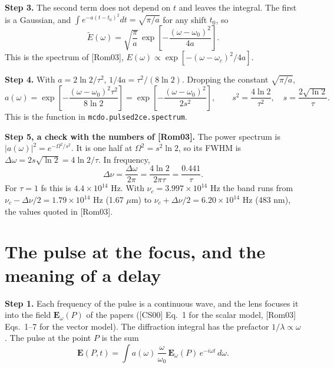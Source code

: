 \documentclass[11pt]{article}
\begin{document}
\textbf{Step 3.} The second term does not depend on $t$ and leaves the integral. The first is a Gaussian, and
$\int e^{-a(t-t_0)^2}dt = \sqrt{\pi/a}$ for any shift $t_0$, so
\begin{equation}\tilde E(\omega) = \sqrt{\frac{\pi}{a}}\,\exp\!\left[-\frac{(\omega-\omega_0)^2}{4a}\right] .\end{equation}
This is the spectrum of [Rom03], $E(\omega) \propto \exp[-(\omega-\omega_c)^2/4a]$.

\textbf{Step 4.} With $a = 2\ln 2/\tau^2$, $1/4a = \tau^2/(8\ln 2)$. Dropping the constant $\sqrt{\pi/a}$,
\begin{equation}a(\omega) = \exp\!\left[-\frac{(\omega-\omega_0)^2\tau^2}{8\ln 2}\right]
= \exp\!\left[-\frac{(\omega-\omega_0)^2}{2s^2}\right],\qquad s^2 = \frac{4\ln 2}{\tau^2},\quad
s = \frac{2\sqrt{\ln 2}}{\tau} .\label{eq:spec}\end{equation}
This is the function in \texttt{mcdo.pulsed2ce.spectrum}.

\textbf{Step 5, a check with the numbers of [Rom03].} The power spectrum is $|a(\omega)|^2 = e^{-\Omega^2/s^2}$. It is
one half at $\Omega^2 = s^2\ln 2$, so its FWHM is $\Delta\omega = 2s\sqrt{\ln 2} = 4\ln 2/\tau$. In frequency,
\begin{equation}\Delta\nu = \frac{\Delta\omega}{2\pi} = \frac{4\ln 2}{2\pi\tau} = \frac{0.441}{\tau} .\end{equation}
For $\tau = 1$ fs this is $4.4\times10^{14}$ Hz. With $\nu_c = 3.997\times10^{14}$ Hz the band runs from
$\nu_c - \Delta\nu/2 = 1.79\times10^{14}$ Hz (1.67 $\mu$m) to $\nu_c + \Delta\nu/2 = 6.20\times10^{14}$ Hz (483 nm),
the values quoted in [Rom03].

\section{The pulse at the focus, and the meaning of a delay}
\textbf{Step 1.} Each frequency of the pulse is a continuous wave, and the lens focuses it into the field
$\mathbf{E}_\omega(P)$ of the papers ([CS00] Eq.~1 for the scalar model, [Rom03] Eqs.~1--7 for the vector model).
The diffraction integral has the prefactor $1/\lambda \propto \omega$. The pulse at the point $P$ is the sum
\begin{equation}\mathbf{E}(P,t) = \int a(\omega)\,\frac{\omega}{\omega_0}\,\mathbf{E}_\omega(P)\,e^{-i\omega t}\,d\omega .\label{eq:field}\end{equation}
\end{document}

